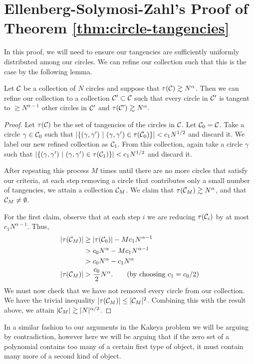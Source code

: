 \section{Ellenberg-Solymosi-Zahl's Proof of Theorem \ref{thm:circle-tangencies}}
In this proof, we will need to ensure our tangencies
are sufficiently uniformly distributed among our circles. We can refine our collection such that this is the case by the following lemma.


\begin{lemma}
    Let $\mathcal C$ be a collection of $N$ circles and suppose that  $\tau(\mathcal C) \gtrsim N^{\alpha}$. 
    Then we can refine our collection to a collection $\mathcal C' \subset \mathcal C$ such that every circle in $\mathcal C'$ is tangent to $\gtrsim N^{\alpha -1}$ other circles in $\mathcal C'$ and $\tau(\mathcal C') \gtrsim N^{\alpha}.$ \label{lem:uniform-refine}
\end{lemma}

\begin{proof}
Let $\tau(\mathcal C)$ be the set of tangencies of the circles in $\mathcal C$. Let $\mathcal C_0 = \mathcal C$. Take a circle $\gamma \in \mathcal C_0$ such that $|\{(\gamma, \gamma') \ |\ (\gamma, \gamma') \in \tau(\mathcal C_0)\}| < c_1 N^{1/2}$
and discard it. We label our new refined collection as $\mathcal C_1$. From this collection, again take a circle $\gamma$ such that $|\{(\gamma, \gamma') \ |\ (\gamma, \gamma') \in \tau(\mathcal C_1)\}| < c_1 N^{1/2}$ and discard it. 

After repeating this process $M$ times until there are no more circles that satisfy our criteria, 
at each step removing a circle that contributes only a small number of tangencies, we attain a collection $\mathcal C_M$.
 We claim that $\tau(\mathcal C_M) \gtrsim N^{\alpha}$, and that $\mathcal C_M \neq \emptyset$.

For the first claim, observe that at each step $i$ we are reducing $\tau(\mathcal C_i)$ by at most $c_1 N^{\alpha -1}$.  Thus,
\begin{align*}
    |\tau(\mathcal C_M)| &\geq |\tau(\mathcal C_0)| - M c_1 N^{\alpha -1} \\
    &> c_0 N^{\alpha} -  M c_1 N^{\alpha -1} \\ 
    &> c_0 N^{\alpha} - c_1 N^{\alpha} \\
    |\tau(\mathcal C_M)| &> \frac{c_0}{2} N^{\alpha}. \qquad (\text{by choosing } c_1 = c_0/2 )
\end{align*}
We must now check that we have not removed every circle from our collection. We have the trivial inequality $|\tau(\mathcal C_M)| \leq |\mathcal C_M|^{2}$. 
Combining this with the result above, we attain $|\mathcal C_M| \gtrsim |N|^{\alpha/2}$.
\end{proof}
In a similar fashion to our arguments in the Kakeya problem we will be arguing by contradiction, however here we will be arguing that if the zero set of a polynomial contains too many of a certain first type of object, 
it must contain many more of a second kind of object. 





